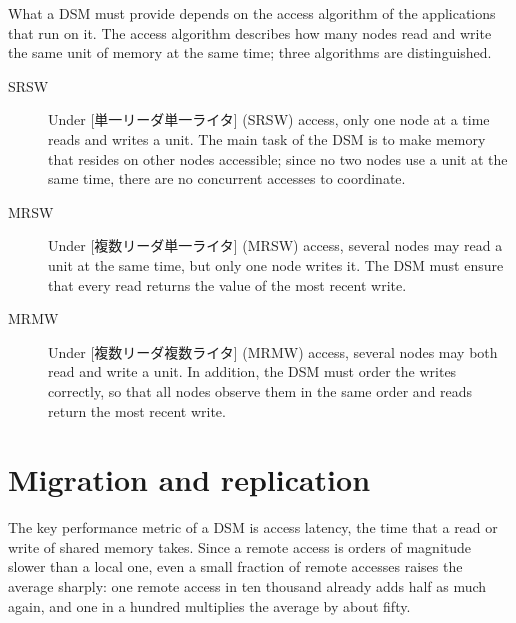 \documentclass[../main.tex]{subfiles}
\begin{document}
What a DSM must provide depends on the access algorithm of the applications
that run on it.
The access algorithm describes how many nodes read and write the same unit
of memory at the same time; three algorithms are distinguished.
\begin{description}
  \item[SRSW] Under
    [単一リーダ単一ライタ]%
     (SRSW) access, only one
    node at a time reads and writes a unit.  The main task of the DSM is to
    make memory that resides on other nodes accessible; since no two nodes
    use a unit at the same time, there are no concurrent accesses to
    coordinate.
  \item[MRSW] Under
    [複数リーダ単一ライタ]%
     (MRSW) access, several
    nodes may read a unit at the same time, but only one node writes it.
    The DSM must ensure that every read returns the value of the most
    recent write.
  \item[MRMW] Under
    [複数リーダ複数ライタ]%
     (MRMW) access,
    several nodes may both read and write a unit.  In addition, the DSM
    must order the writes correctly, so that all nodes observe them in the
    same order and reads return the most recent write.
\end{description}

\section{Migration and replication}
\label{sec:l15-migration}

The key performance metric of a DSM is access latency, the time that a
read or write of shared memory takes.  Since a remote access is orders of
magnitude slower than a local one, even a small fraction of remote accesses
raises the average sharply: one remote access in ten thousand already adds
half as much again, and one in a hundred multiplies the average by about
fifty.
\end{document}

